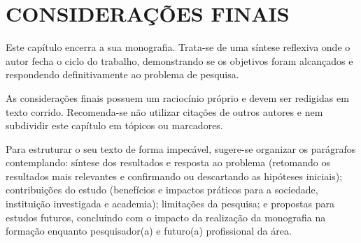 \chapter{CONSIDERAÇÕES FINAIS}
Este capítulo encerra a sua monografia. Trata-se de uma síntese reflexiva onde o autor fecha o ciclo do trabalho, demonstrando se os objetivos foram alcançados e respondendo definitivamente ao problema de pesquisa.

As considerações finais possuem um raciocínio próprio e devem ser redigidas em texto corrido. Recomenda-se não utilizar citações de outros autores e nem subdividir este capítulo em tópicos ou marcadores.

Para estruturar o seu texto de forma impecável, sugere-se organizar os parágrafos contemplando: síntese dos resultados e resposta ao problema (retomando os resultados mais relevantes e confirmando ou descartando as hipóteses iniciais); contribuições do estudo (benefícios e impactos práticos para a sociedade, instituição investigada e academia); limitações da pesquisa; e propostas para estudos futuros, concluindo com o impacto da realização da monografia na formação enquanto pesquisador(a) e futuro(a) profissional da área.
